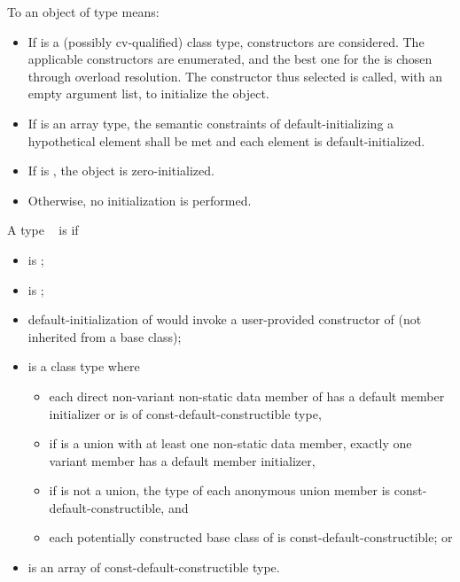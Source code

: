 \pnum
To
an object of type
means:

\begin{itemize}
\item
If
is a (possibly cv-qualified) class type,
constructors are considered. The applicable constructors are
enumerated, and the best one for the
 \tcode{()} is chosen through
overload resolution. The constructor thus selected
is called, with an empty argument list, to initialize the object.

\item
If
is an array type,
the semantic constraints of default-initializing a hypothetical element
shall be met and
each element is default-initialized.

\item
If  is , the object is zero-initialized.

\item
Otherwise,
no initialization is performed.
\end{itemize}

\pnum
A type \cv{}~ is  if
\begin{itemize}
\item
{} is ;
\item
{} is ;
\item
default-initialization of  would invoke
a user-provided constructor of  (not inherited from a base class);
\item
{} is a class type where
\begin{itemize}
\item
each direct non-variant non-static data member of 
has a default member initializer or
is of const-default-constructible type,
\item
if  is a union with at least one non-static data member,
exactly one variant member has a default member initializer,
\item
if  is not a union,
the type of each anonymous union member is const-default-constructible, and
\item
each potentially constructed base class of  is const-default-constructible; or
\end{itemize}
\item
{} is an array of const-default-constructible type.
\end{itemize}

